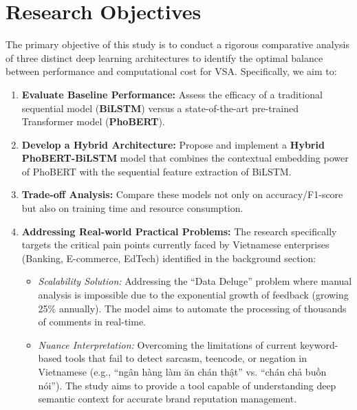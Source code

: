 \documentclass[12pt]{report} %
\begin{document}
\section{Research Objectives}
The primary objective of this study is to conduct a rigorous comparative analysis of three distinct deep learning architectures to identify the optimal balance between performance and computational cost for VSA. Specifically, we aim to:
\begin{enumerate}
    \item \textbf{Evaluate Baseline Performance:} Assess the efficacy of a traditional sequential model (\textbf{BiLSTM}) versus a state-of-the-art pre-trained Transformer model (\textbf{PhoBERT}).
    \item \textbf{Develop a Hybrid Architecture:} Propose and implement a \textbf{Hybrid PhoBERT-BiLSTM} model that combines the contextual embedding power of PhoBERT with the sequential feature extraction of BiLSTM.
    \item \textbf{Trade-off Analysis:} Compare these models not only on accuracy/F1-score but also on training time and resource consumption.
    \item \textbf{Addressing Real-world Practical Problems:}
    The research specifically targets the critical pain points currently faced by Vietnamese enterprises (Banking, E-commerce, EdTech) identified in the background section:
    \begin{itemize}
        \item \textit{Scalability Solution:} Addressing the ``Data Deluge'' problem where manual analysis is impossible due to the exponential growth of feedback (growing 25\% annually). The model aims to automate the processing of thousands of comments in real-time.
        \item \textit{Nuance Interpretation:} Overcoming the limitations of current keyword-based tools that fail to detect sarcasm, teencode, or negation in Vietnamese (e.g., \foreignlanguage{vietnamese}{``ngân hàng làm ăn chán thật''} vs. \foreignlanguage{vietnamese}{``chán chả buồn nói''}). The study aims to provide a tool capable of understanding deep semantic context for accurate brand reputation management.
    \end{itemize}


\end{enumerate}
\end{document}
